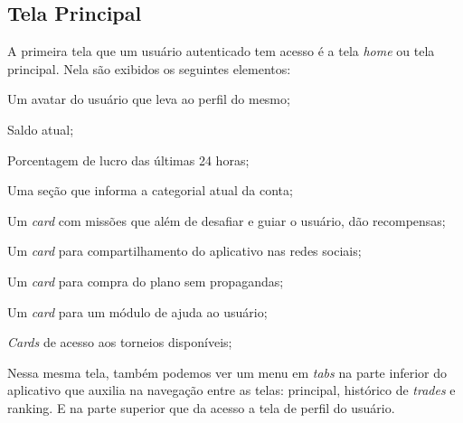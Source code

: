\subsection{Tela Principal}
A primeira tela que um usuário autenticado tem acesso é a tela \textit{home} ou tela principal. Nela são exibidos os seguintes elementos:

\begin{lista}
  \item Um avatar do usuário que leva ao perfil do mesmo;
  \item Saldo atual;
  \item Porcentagem de lucro das últimas 24 horas;
  \item Uma seção que informa a categorial atual da conta;
  \item Um \textit{card} com missões que além de desafiar e guiar o usuário, dão recompensas;
  \item Um \textit{card} para compartilhamento do aplicativo nas redes sociais;
  \item Um \textit{card} para compra do plano sem propagandas;
  \item Um \textit{card} para um módulo de ajuda ao usuário;
  \item \textit{Cards} de acesso aos torneios disponíveis;
\end{lista}

Nessa mesma tela, também podemos ver um menu em \textit{tabs} na parte inferior do aplicativo que auxilia na navegação entre as telas: principal, histórico de \textit{trades} e ranking. E na parte superior que da acesso a tela de perfil do usuário.

